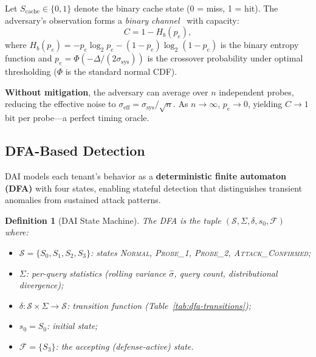 \documentclass[11pt]{article}
\newtheorem{definition}{Definition}
\begin{document}
Let $S_{\mathrm{cache}} \in \{0, 1\}$ denote the binary cache state (0 = miss, 1 = hit).
The adversary's observation forms a \emph{binary channel}~\cite{shannon1948mathematical}
with capacity:
\begin{equation}
    C = 1 - H_b(p_e),
    \label{eq:channel-capacity}
\end{equation}
where $H_b(p_e) = -p_e \log_2 p_e - (1 - p_e)\log_2(1 - p_e)$ is the binary entropy
function and $p_e = \Phi(-\Delta / (2\sigma_{\mathrm{sys}}))$ is the crossover probability
under optimal thresholding ($\Phi$ is the standard normal CDF).

\textbf{Without mitigation}, the adversary can average over $n$ independent probes,
reducing the effective noise to $\sigma_{\mathrm{eff}} = \sigma_{\mathrm{sys}} / \sqrt{n}$.
As $n \to \infty$, $p_e \to 0$, yielding $C \to 1$ bit per probe---a perfect timing oracle.

\subsection{DFA-Based Detection}
\label{sec:dai:dfa}

DAI models each tenant's behavior as a \textbf{deterministic finite automaton (DFA)} with
four states, enabling stateful detection that distinguishes transient anomalies from
sustained attack patterns.

\begin{definition}[DAI State Machine]
The DFA is the tuple $(\mathcal{S}, \Sigma, \delta, s_0, \mathcal{F})$ where:
\begin{itemize}[leftmargin=1.5em,itemsep=2pt]
    \item $\mathcal{S} = \{S_0, S_1, S_2, S_3\}$: states \textsc{Normal},
          \textsc{Probe\_1}, \textsc{Probe\_2}, \textsc{Attack\_Confirmed};
    \item $\Sigma$: per-query statistics (rolling variance $\hat{\sigma}$, query count,
          distributional divergence);
    \item $\delta: \mathcal{S} \times \Sigma \to \mathcal{S}$: transition function
          (Table~\ref{tab:dfa-transitions});
    \item $s_0 = S_0$: initial state;
    \item $\mathcal{F} = \{S_3\}$: the accepting (defense-active) state.
\end{itemize}
\end{definition}
\end{document}
